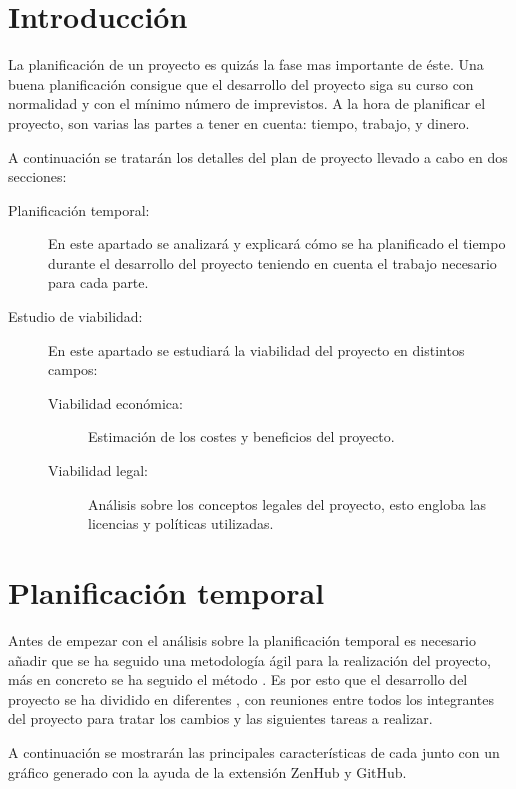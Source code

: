 
\section{Introducción}

La planificación de un proyecto es quizás la fase mas importante de éste. Una buena planificación consigue que el desarrollo del proyecto siga su curso con normalidad y con el mínimo número de imprevistos. A la hora de planificar el proyecto, son varias las partes a tener en cuenta: tiempo, trabajo, y dinero.

A continuación se tratarán los detalles del plan de proyecto llevado a cabo en dos secciones:

\begin{description}
    \item[Planificación temporal:] En este apartado se analizará y explicará cómo se ha planificado el tiempo durante el desarrollo del proyecto teniendo en cuenta el trabajo necesario para cada parte.
    \item[Estudio de viabilidad:] En este apartado se estudiará la viabilidad del proyecto en distintos campos:
    \begin{description}
        \item[Viabilidad económica:] Estimación de los costes y beneficios del proyecto.
        \item[Viabilidad legal:] Análisis sobre los conceptos legales del proyecto, esto engloba las licencias y políticas utilizadas.
    \end{description}
\end{description}

\section{Planificación temporal}

Antes de empezar con el análisis sobre la planificación temporal es necesario añadir que se ha seguido una metodología ágil para la realización del proyecto, más en concreto se ha seguido el método . Es por esto que el desarrollo del proyecto se ha dividido en diferentes , con reuniones entre todos los integrantes del proyecto para tratar los cambios y las siguientes tareas a realizar.

A continuación se mostrarán las principales características de cada  junto con un gráfico  generado con la ayuda de la extensión ZenHub y GitHub.

